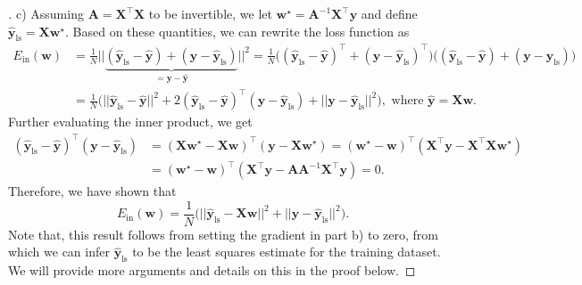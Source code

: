 \documentclass{article}
\renewcommand{\vec}[1]{\mathbf{#1}}
\begin{document}
    \begin{proof}[\unskip\nopunct]
        c) Assuming $\vec{A} = \vec{X}^\top\vec{X}$ to be invertible, we let 
        $\vec{w}^\star=\vec{A}^{-1}\vec{X}^\top\vec{y}$ and 
        define $\hat{\vec{y}}_{\text{ls}}=\vec{X}\vec{w}^\star$. 
        Based on these quantities, we can rewrite the loss function as
        \begin{align*}
            E_{\text{in}}(\vec{w}) &= \frac{1}{N}||\underbrace{(\hat{\vec{y}}_
            {\text{ls}}-\hat{\vec{y}})+(\vec{y}-\hat{\vec{y}}_{\text{ls}})}_
            {=\vec{y}-\hat{\vec{y}}}||^2 = \frac{1}{N}\big((\hat{\vec{y}}_
            {\text{ls}}-\hat{\vec{y}})^\top+(\vec{y}-\hat{\vec{y}}_
            {\text{ls}})^\top\big)\big((\hat{\vec{y}}_{\text{ls}}-\hat{
            \vec{y}})+(\vec{y}-\hat{\vec{y}}_{\text{ls}})\big)\\
            &= \frac{1}{N}\big(||\hat{\vec{y}}_{\text{ls}}-\hat{\vec{y}}||^2
            +2(\hat{\vec{y}}_{\text{ls}}-\hat{\vec{y}})^\top(\vec{y}-\hat{
            \vec{y}}_{\text{ls}})+||\vec{y}-\hat{\vec{y}}_
            {\text{ls}}||^2\big), \text{ where }\hat{\vec{y}}=\vec{X}\vec{w}.
        \end{align*}
        Further evaluating the inner product, we get
        \begin{align*}
            (\hat{\vec{y}}_{\text{ls}}-\hat{\vec{y}})^\top(\vec{y}-\hat{
            \vec{y}}_{\text{ls}}) &= (\vec{X}\vec{w}^\star-\vec{X}\vec{w})^
            \top(\vec{y}-\vec{X}\vec{w}^\star)=(\vec{w}^\star-\vec{w})^\top(
            \vec{X}^\top\vec{y}-\vec{X}^\top\vec{X}\vec{w}^\star)\\
            &= (\vec{w}^\star-\vec{w})^\top(\vec{X}^\top\vec{y}-\vec{A}\vec{A}
            ^{-1}\vec{X}^\top\vec{y}) = 0.
        \end{align*}
        Therefore, we have shown that 
        \begin{equation}
            \label{eqn:loss_least_squares}
            E_{\text{in}}(\vec{w}) = \frac{1}{N}\big(||\hat{\vec{y}}_{
            \text{ls}}-\vec{X}\vec{w}||^2+||\vec{y}-\hat{\vec{y}}_{\text{ls}}
            ||^2\big).
        \end{equation}
        Note that, this result follows from setting the gradient in part b) 
        to zero, from which we can infer $\hat{\vec{y}}_{\text{ls}}$ to be 
        the least squares estimate for the training dataset. We will provide 
        more arguments and details on this in the proof below.
    \end{proof}
\end{document}
